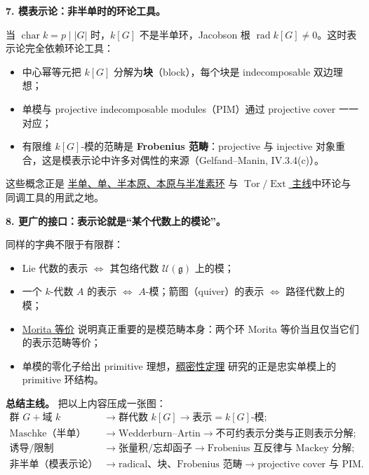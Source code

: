 \documentclass[a4paper]{ctexart}
\theoremstyle{definition}
\theoremstyle{analysis}
\theoremstyle{plain}
\begin{document}
\medskip
\textbf{7. 模表示论：非半单时的环论工具。}

当 \(\operatorname{char}k=p\mid |G|\) 时，\(k[G]\) 不是半单环，Jacobson 根 \(\operatorname{rad}k[G]\neq 0\)。这时表示论完全依赖环论工具：
\begin{itemize}
  \item 中心幂等元把 \(k[G]\) 分解为\textbf{块}（block），每个块是 indecomposable 双边理想；
  \item 单模与 projective indecomposable modules（PIM）通过 projective cover 一一对应；
  \item 有限维 \(k[G]\)-模的范畴是 \textbf{Frobenius 范畴}：projective 与 injective 对象重合，这是模表示论中许多对偶性的来源（Gelfand--Manin, IV.3.4(c)）。
\end{itemize}
这些概念正是 \hyperref[subsec:topic-simple-primitive-spectrum]{半单、单、半本原、本原与半准素环} 与 \hyperref[subsec:topic-derived-functors]{\(\operatorname{Tor}/\operatorname{Ext}\) 主线}\allowbreak 中环论与同调工具的用武之地。

\medskip
\textbf{8. 更广的接口：表示论就是“某个代数上的模论”。}

同样的字典不限于有限群：
\begin{itemize}
  \item Lie 代数的表示 \(\iff\) 其包络代数 \(\mathcal U(\mathfrak g)\) 上的模；
  \item 一个 \(k\)-代数 \(A\) 的表示 \(\iff\) \(A\)-模；箭图（quiver）的表示 \(\iff\) 路径代数上的模；
  \item \hyperref[subsec:topic-morita-equivalence]{Morita 等价} 说明真正重要的是模范畴本身：两个环 Morita 等价当且仅当它们的表示范畴等价；
  \item 单模的零化子给出 primitive 理想，\hyperref[subsec:topic-density-theorem]{稠密性定理} 研究的正是忠实单模上的 primitive 环结构。
\end{itemize}

\medskip
\textbf{总结主线。} 把以上内容压成一张图：
\[
\begin{aligned}
  \text{群 }G+\text{域 }k
  &\longrightarrow
  \text{群代数 }k[G]
  \longrightarrow
  \text{表示}=k[G]\text{-模};\\
  \text{Maschke（半单）}
  &\longrightarrow
  \text{Wedderburn--Artin}
  \longrightarrow
  \text{不可约表示分类与正则表示分解};\\
  \text{诱导/限制}
  &\longrightarrow
  \text{张量积/忘却函子}
  \longrightarrow
  \text{Frobenius 互反律与 Mackey 分解};\\
  \text{非半单（模表示论）}
  &\longrightarrow
  \text{radical、块、Frobenius 范畴}
  \longrightarrow
  \text{projective cover 与 PIM}.
\end{aligned}
\]
\end{document}
